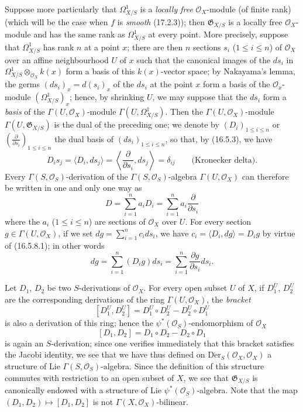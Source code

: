 \begin{env}[16.5.8]
\label{IV.16.5.8}
Suppose more particularly that $\Omega_{X/S}^1$ is a \emph{locally free}
$\mathcal{O}_X$-module (of finite rank) (which will be the
case when $f$ is \emph{smooth} (17.2.3)); then $\mathfrak{G}_{X/S}$ is a locally
free $\mathcal{O}_X$-module and has the same rank as $\Omega_{X/S}^1$
at every point. More precisely, suppose that $\Omega_{X/S}^1$ has
rank $n$ at a point $x$; there are then $n$ sections $s_i$ ($1\leq i\leq n$)
of $\mathcal{O}_X$ over an affine neighbourhood $U$ of $x$ such that the
canonical images of the $ds_i$ in
$\Omega_{X/S}^1\otimes_{\mathcal{O}_X}k(x)$ form a basis of this
$k(x)$-vector space; by Nakayama's lemma, the germs
$(ds_i)_x=d(s_i)_x$ of the $ds_i$ at the point $x$ form a basis of the
$\mathcal{O}_x$-module $(\Omega_{X/S}^1)_x$; hence, by shrinking $U$, we
may suppose that the $ds_i$ form a \emph{basis} of the
$\Gamma(U,\mathcal{O}_X)$-module $\Gamma(U,\Omega_{X/S}^1)$. Then the
$\Gamma(U,\mathcal{O}_X)$-module $\Gamma(U,\mathfrak{G}_{X/S})$ is the dual of
the preceding one; we denote by $(D_i)_{1\leq i\leq n}$ or
$\left(\frac{\partial}{\partial s_i}\right)_{1\leq i\leq n}$ the dual basis of
$(ds_i)_{1\leq i\leq n}$, so that, by (16.5.3), we have
\[
  D_is_j=\langle D_i,ds_j\rangle
  =\left\langle\frac{\partial}{\partial s_i},ds_j\right\rangle
  =\delta_{ij}\qquad\text{(Kronecker delta).}
  \tag{16.5.8.1}
  \label{IV.16.5.8.1}
\]
Every $\Gamma(S,\mathcal{O}_S)$-derivation of the
$\Gamma(S,\mathcal{O}_S)$-algebra $\Gamma(U,\mathcal{O}_X)$ can therefore be
written in one and only one way as
\[
  D=\sum_{i=1}^n a_iD_i=\sum_{i=1}^n a_i\frac{\partial}{\partial s_i}
\]
where the $a_i$ ($1\leq i\leq n$) are sections of $\mathcal{O}_X$ over
$U$. For every section $g\in\Gamma(U,\mathcal{O}_X)$, if we set
$dg=\sum_{i=1}^n c_i ds_i$, we have
$c_i=\langle D_i,dg\rangle=D_ig$ by virtue of (16.5.8.1); in other words
\[
  dg=\sum_{i=1}^n(D_ig)ds_i
  =\sum_{i=1}^n\frac{\partial g}{\partial s_i}ds_i.
  \tag{16.5.8.2}
  \label{IV.16.5.8.2}
\]
\end{env}

\begin{env}[16.5.9]
\label{IV.16.5.9}
Let $D_1$, $D_2$ be two $S$-derivations of $\mathcal{O}_X$. For every open
subset $U$ of $X$, if $D_1^U$, $D_2^U$ are the corresponding derivations of
the ring $\Gamma(U,\mathcal{O}_X)$, the \emph{bracket}
\[
  [D_1^U,D_2^U]=D_1^U\circ D_2^U-D_2^U\circ D_1^U
\]
is also a derivation of this ring; hence the
$\psi^*(\mathcal{O}_S)$-endomorphism of $\mathcal{O}_X$
\[
  [D_1,D_2]=D_1\circ D_2-D_2\circ D_1
  \tag{16.5.9.1}
  \label{IV.16.5.9.1}
\]
is again an $S$-derivation; since one verifies immediately that this bracket
satisfies the Jacobi identity, we see that we have thus defined on
$\operatorname{D\acute{e}r}_S(\mathcal{O}_X,\mathcal{O}_X)$ a structure of
Lie $\Gamma(S,\mathcal{O}_S)$-algebra. Since the definition of this
structure commutes with restriction to an open subset of $X$, we see that
$\mathfrak{G}_{X/S}$ is canonically endowed with a structure of
Lie $\psi^*(\mathcal{O}_S)$-algebra. Note that the map
$(D_1,D_2)\mapsto[D_1,D_2]$ is not
$\Gamma(X,\mathcal{O}_X)$-bilinear.
\end{env}

